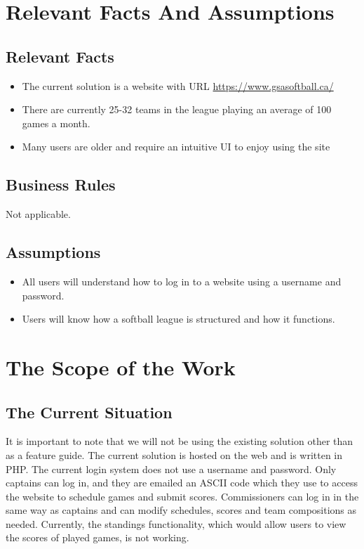 \documentclass[12pt]{article}
\begin{document}
\section{Relevant Facts And Assumptions}
\subsection{Relevant Facts}
\begin{itemize}
  \item The current solution is a website with URL 
  \url{https://www.gsasoftball.ca/}
  \item There are currently 25-32 teams in the league playing an average of
  100 games a month.
  \item Many users are older and require an intuitive UI to enjoy using the
  site
\end{itemize}

\subsection{Business Rules}
Not applicable.

\subsection{Assumptions}
\begin{itemize}
  \item All users will understand how to log in to a website using a username
  and password.
  \item Users will know how a softball league is structured and how it functions.
\end{itemize}

\section{The Scope of the Work}
\subsection{The Current Situation}
It is important to note that we will not be using the existing solution other
than as a feature guide. The current solution is hosted on the web and is
written in PHP. The current login system does not use a username and password.
Only captains can log in, and they are emailed an ASCII code which they use to
access the website to schedule games and submit scores. Commissioners can log in
in the same way as captains and can modify schedules, scores and team
compositions as needed. Currently, the standings functionality, which would
allow users to view the scores of played games, is not working.
\end{document}
